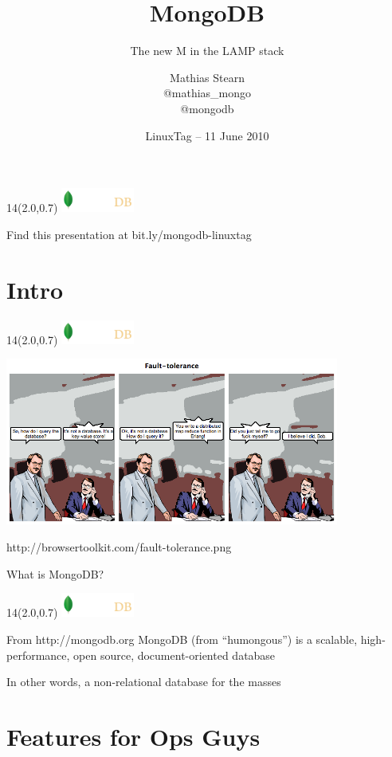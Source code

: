 \documentclass{beamer}
\title{MongoDB}
\subtitle{The new M in the LAMP stack}
\author{Mathias Stearn \\ @mathias\_mongo \\ @mongodb}
\institute{ \includegraphics[height=0.8cm]{10gen.png} }
\date{LinuxTag -- 11 June 2010}
\newcommand{\MongoLogo}{
\begin{textblock}{14}(2.0,0.7)
  \includegraphics[height=0.8cm]{logo-mongodb-ondark.png}
\end{textblock}
}
\begin{document}
\begin{frame}
  \MongoLogo
  \titlepage
  
  \begin{center}
    Find this presentation at bit.ly/mongodb-linuxtag
  \end{center}
\end{frame}


\section{Intro}

\begin{frame}
  \MongoLogo

  \begin{center}
    \includegraphics[height=5.5cm]{comic-not-a-db.png} 

    http://browsertoolkit.com/fault-tolerance.png
  \end{center}
\end{frame}

\begin{frame}[fragile]{What is MongoDB?}
  \MongoLogo
  \begin{block}{From http://mongodb.org}
    MongoDB (from ``humongous'') is a scalable, high-performance, open source, document-oriented database
  \end{block}

  In other words, a non-relational database for the masses
\end{frame}

\section{Features for Ops Guys}
\end{document}
